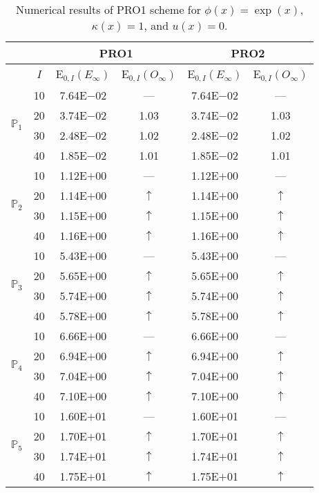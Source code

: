 \begin{table}[H]
\caption{Numerical results of PRO1 scheme for $\phi(x)=\exp(x)$, $\kappa(x)=1$, and $u(x)=0$.}
\setlength{\tabcolsep}{5pt}
\centering
\begin{tabular}{@{}l c c c c c@{}}
\toprule
 &  & \multicolumn{2}{c}{PRO1} & \multicolumn{2}{c}{PRO2}\\
\midrule
 & $I$ & E$_{0,I}(E_{\infty})$ & E$_{0,I}(O_{\infty})$ & E$_{0,I}(E_{\infty})$ & E$_{0,I}(O_{\infty})$\\
\midrule
\multirow{4}{*}{$\mathbb{P}_{1}$}
 & 10 & 7.64E$-$02 & --- & 7.64E$-$02 & ---\\
 & 20 & 3.74E$-$02 & 1.03 & 3.74E$-$02 & 1.03 \\
 & 30 & 2.48E$-$02 & 1.02 & 2.48E$-$02 & 1.02 \\
 & 40 & 1.85E$-$02 & 1.01 & 1.85E$-$02 & 1.01 \\
\midrule
\multirow{4}{*}{$\mathbb{P}_{2}$}
 & 10 & 1.12E$+$00 & --- & 1.12E$+$00 & ---\\
 & 20 & 1.14E$+$00 & $\uparrow$ & 1.14E$+$00 & $\uparrow$ \\
 & 30 & 1.15E$+$00 & $\uparrow$ & 1.15E$+$00 & $\uparrow$ \\
 & 40 & 1.16E$+$00 & $\uparrow$ & 1.16E$+$00 & $\uparrow$ \\
\midrule
\multirow{4}{*}{$\mathbb{P}_{3}$}
 & 10 & 5.43E$+$00 & --- & 5.43E$+$00 & ---\\
 & 20 & 5.65E$+$00 & $\uparrow$ & 5.65E$+$00 & $\uparrow$ \\
 & 30 & 5.74E$+$00 & $\uparrow$ & 5.74E$+$00 & $\uparrow$ \\
 & 40 & 5.78E$+$00 & $\uparrow$ & 5.78E$+$00 & $\uparrow$ \\
\midrule
\multirow{4}{*}{$\mathbb{P}_{4}$}
 & 10 & 6.66E$+$00 & --- & 6.66E$+$00 & ---\\
 & 20 & 6.94E$+$00 & $\uparrow$ & 6.94E$+$00 & $\uparrow$ \\
 & 30 & 7.04E$+$00 & $\uparrow$ & 7.04E$+$00 & $\uparrow$ \\
 & 40 & 7.10E$+$00 & $\uparrow$ & 7.10E$+$00 & $\uparrow$ \\
\midrule
\multirow{4}{*}{$\mathbb{P}_{5}$}
 & 10 & 1.60E$+$01 & --- & 1.60E$+$01 & ---\\
 & 20 & 1.70E$+$01 & $\uparrow$ & 1.70E$+$01 & $\uparrow$ \\
 & 30 & 1.74E$+$01 & $\uparrow$ & 1.74E$+$01 & $\uparrow$ \\
 & 40 & 1.75E$+$01 & $\uparrow$ & 1.75E$+$01 & $\uparrow$ \\
\bottomrule
\end{tabular}
\label{Table:PRO:Test1}
\end{table}
